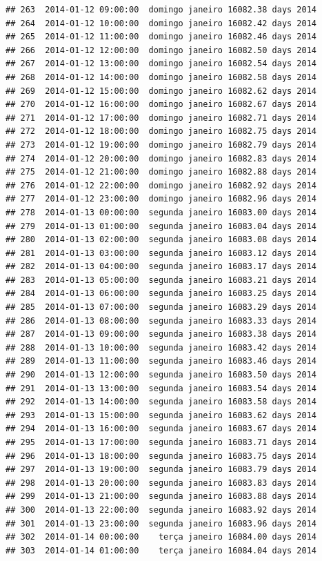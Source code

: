 \documentclass[]{book}
\begin{document}
\begin{verbatim}
## 263  2014-01-12 09:00:00  domingo janeiro 16082.38 days 2014
## 264  2014-01-12 10:00:00  domingo janeiro 16082.42 days 2014
## 265  2014-01-12 11:00:00  domingo janeiro 16082.46 days 2014
## 266  2014-01-12 12:00:00  domingo janeiro 16082.50 days 2014
## 267  2014-01-12 13:00:00  domingo janeiro 16082.54 days 2014
## 268  2014-01-12 14:00:00  domingo janeiro 16082.58 days 2014
## 269  2014-01-12 15:00:00  domingo janeiro 16082.62 days 2014
## 270  2014-01-12 16:00:00  domingo janeiro 16082.67 days 2014
## 271  2014-01-12 17:00:00  domingo janeiro 16082.71 days 2014
## 272  2014-01-12 18:00:00  domingo janeiro 16082.75 days 2014
## 273  2014-01-12 19:00:00  domingo janeiro 16082.79 days 2014
## 274  2014-01-12 20:00:00  domingo janeiro 16082.83 days 2014
## 275  2014-01-12 21:00:00  domingo janeiro 16082.88 days 2014
## 276  2014-01-12 22:00:00  domingo janeiro 16082.92 days 2014
## 277  2014-01-12 23:00:00  domingo janeiro 16082.96 days 2014
## 278  2014-01-13 00:00:00  segunda janeiro 16083.00 days 2014
## 279  2014-01-13 01:00:00  segunda janeiro 16083.04 days 2014
## 280  2014-01-13 02:00:00  segunda janeiro 16083.08 days 2014
## 281  2014-01-13 03:00:00  segunda janeiro 16083.12 days 2014
## 282  2014-01-13 04:00:00  segunda janeiro 16083.17 days 2014
## 283  2014-01-13 05:00:00  segunda janeiro 16083.21 days 2014
## 284  2014-01-13 06:00:00  segunda janeiro 16083.25 days 2014
## 285  2014-01-13 07:00:00  segunda janeiro 16083.29 days 2014
## 286  2014-01-13 08:00:00  segunda janeiro 16083.33 days 2014
## 287  2014-01-13 09:00:00  segunda janeiro 16083.38 days 2014
## 288  2014-01-13 10:00:00  segunda janeiro 16083.42 days 2014
## 289  2014-01-13 11:00:00  segunda janeiro 16083.46 days 2014
## 290  2014-01-13 12:00:00  segunda janeiro 16083.50 days 2014
## 291  2014-01-13 13:00:00  segunda janeiro 16083.54 days 2014
## 292  2014-01-13 14:00:00  segunda janeiro 16083.58 days 2014
## 293  2014-01-13 15:00:00  segunda janeiro 16083.62 days 2014
## 294  2014-01-13 16:00:00  segunda janeiro 16083.67 days 2014
## 295  2014-01-13 17:00:00  segunda janeiro 16083.71 days 2014
## 296  2014-01-13 18:00:00  segunda janeiro 16083.75 days 2014
## 297  2014-01-13 19:00:00  segunda janeiro 16083.79 days 2014
## 298  2014-01-13 20:00:00  segunda janeiro 16083.83 days 2014
## 299  2014-01-13 21:00:00  segunda janeiro 16083.88 days 2014
## 300  2014-01-13 22:00:00  segunda janeiro 16083.92 days 2014
## 301  2014-01-13 23:00:00  segunda janeiro 16083.96 days 2014
## 302  2014-01-14 00:00:00    terça janeiro 16084.00 days 2014
## 303  2014-01-14 01:00:00    terça janeiro 16084.04 days 2014

\end{verbatim}
\end{document}
